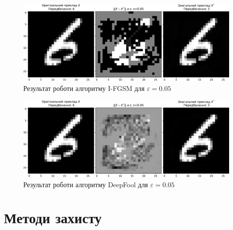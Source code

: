 \documentclass[aspectratio=169]{beamer}
\begin{document}
	
	\begin{frame}
		\begin{figure}
			\begin{minipage}[c]{0.67\textwidth}
				\includegraphics[width=1\textwidth]{../CourseWorkLatex/resources/i-fgsm-example.pdf}
			\end{minipage}\hfill
			\begin{minipage}[c]{0.3\textwidth}
				\caption{
					Результат роботи алгоритму I-FGSM для $\varepsilon = 0.05$
				}
			\end{minipage}
		\end{figure}
		
		\begin{figure}
			\begin{minipage}[c]{0.67\textwidth}
				\includegraphics[width=1\textwidth]{../CourseWorkLatex/resources/deepfool-example.pdf}
			\end{minipage}
			\begin{minipage}[c]{0.3\textwidth}
				\caption{
					Результат роботи алгоритму DeepFool для $\varepsilon = 0.05$
				} \hfill
			\end{minipage}
		\end{figure}
	\end{frame}

	\section{Методи захисту}
		
\end{document}
